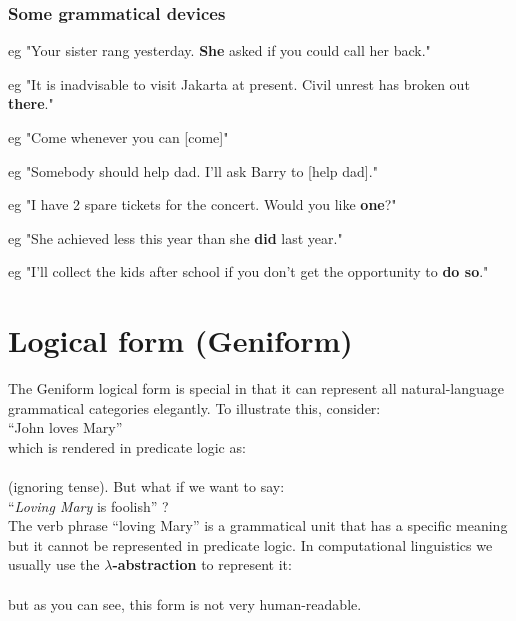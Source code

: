 \subsubsection{Some grammatical devices}


eg "Your sister rang yesterday. \textbf{She} asked if you could call her back."

eg "It is inadvisable to visit Jakarta at present.  Civil unrest has broken out \textbf{there}."


eg "Come whenever you can [come]"

eg "Somebody should help dad.  I'll ask Barry to [help dad]."


eg "I have 2 spare tickets for the concert.  Would you like \textbf{one}?"

eg "She achieved less this year than she \textbf{did} last year."

eg "I'll collect the kids after school if you don't get the opportunity to \textbf{do so}."

\titleformat{\subsection}[hang]{\sffamily\bfseries\large\color{blue}}{\thesubsection \hspace{5pt}}{0pt}{}

\renewcommand{\subsubsection}[1]{\sffamily{\bfseries{\color{blue}{ \stepcounter{subsubsection} #1}}}}

\section{Logical form (Geniform)}
\label{sec:LogicalForm}

The Geniform logical form is special in that it can represent all natural-language grammatical categories elegantly.  To illustrate this, consider:\\
\hspace*{1cm} ``John loves Mary''\\
which is rendered in predicate logic as:\\
\hspace*{1cm} \\
(ignoring tense).  But what if we want to say:\\
\hspace*{1cm} ``\textit{Loving Mary} is foolish'' ?\\
The verb phrase ``loving Mary'' is a grammatical unit that has a specific meaning but it cannot be represented in predicate logic.  In computational linguistics we usually use the \textbf{$\lambda$-abstraction} to represent it:\\
\hspace*{1cm} \\
but as you can see, this form is not very human-readable.

